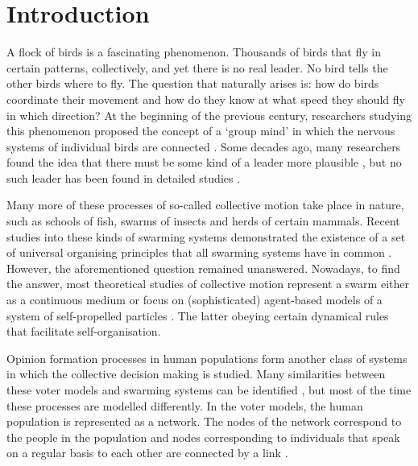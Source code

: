 \chapter{Introduction}

A flock of birds is a fascinating phenomenon. Thousands of birds that fly in certain patterns, collectively, and yet there is no real leader. No bird tells the other birds where to fly. The question that naturally arises is: how do birds coordinate their movement and how do they know at what speed they should fly in which direction? At the beginning of the previous century, researchers studying this phenomenon proposed the concept of a `group mind' in which the nervous systems of individual birds are connected \cite{Selous1931}. Some decades ago, many researchers found the idea that there must be some kind of a leader more plausible \cite{Heppner1990}, but no such leader has been found in detailed studies \cite{Pomeroy1983}. 

Many more of these processes of so-called collective motion take place in nature, such as schools of fish, swarms of insects and herds of certain mammals. Recent studies into these kinds of swarming systems  demonstrated the existence of a set of universal organising principles that all swarming systems have in common \cite{Huepe2011}. However, the aforementioned question remained unanswered. Nowadays, to find the answer, most theoretical studies of collective motion represent a swarm either as a continuous medium \cite{Toner1998} or focus on (sophisticated) agent-based models of a system of self-propelled particles \cite{Huepe2011, VanDrongelen2015, Vicsek1995, Vicsek2012}. The latter obeying certain dynamical rules that facilitate self-organisation. 

Opinion formation processes in human populations form another class of systems in which the collective decision making is studied. Many similarities between these voter models and swarming systems can be identified \cite{Huepe2011}, but most of the time these processes are modelled differently. In the voter models, the human population is represented as a network. The nodes of the network correspond to the people in the population and nodes corresponding to individuals that speak on a regular basis to each other are connected by a link \cite{Sood2005}.

